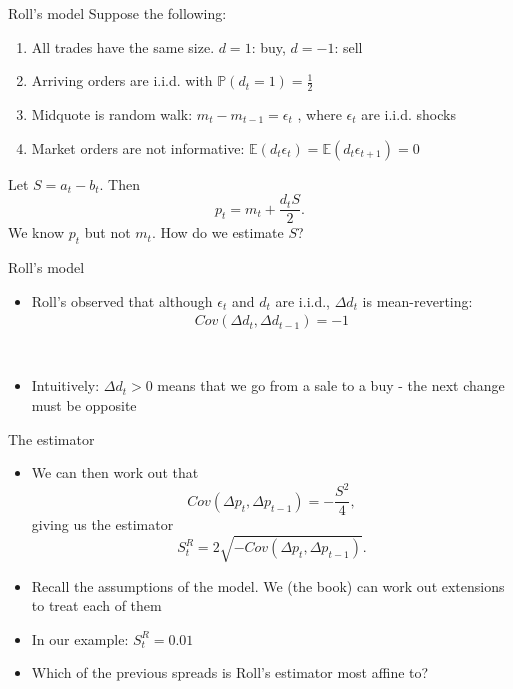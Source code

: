 \documentclass[english,10pt]{beamer}
\begin{document}
\begin{frame}{Roll's model}
	Suppose the following:
	\begin{enumerate}
		\item All trades have the same size. $d=1$: buy, $d=-1$: sell
		\item Arriving orders are i.i.d. with $\mathbb{P}(d_t =1)=\frac{1}{2}$
		\item Midquote is random walk: $m_t -m_{t-1} = \epsilon_t$  , where $\epsilon_t$ are i.i.d. shocks
		\item Market orders are not informative: $\mathbb{E}(d_t \epsilon_t)=\mathbb{E}(d_t \epsilon_{t+1})=0$
	\end{enumerate}
	Let $S = a_t-b_t$. Then
	\[
	p_t = m_t + \frac{d_t S}{2}.
	\]
	We know $p_t$ but not $m_t$. How do we estimate $S$?
\end{frame}


\begin{frame}{Roll's model}
	\begin{itemize}
		\item Roll's observed that although $\epsilon_t$ and $d_t$ are i.i.d., $\Delta d_t$ is mean-reverting:
		\begin{align*}
		Cov(\Delta d_t, \Delta d_{t-1})	= -1
		\\
		\\
		\\
		\\
		\\
		\end{align*}
		\item Intuitively: $\Delta d_t>0$ means that we go from a sale to a buy - the next change must be opposite
	\end{itemize}
\end{frame}


\begin{frame}{The estimator}
	\begin{itemize}
		\item We can then work out that
		\[
		Cov(\Delta p_t, \Delta p_{t-1}) = - \frac{S^2}{4},
		\]
		giving us the estimator
		\[
		S^R_t = 2 \sqrt{-Cov(\Delta p_t, \Delta p_{t-1})}.
		\]
		\item Recall the assumptions of the model. We (the book) can work out extensions to treat each of them
		\item In our example: $S^R_t = 0.01$
		\item Which of the previous spreads is Roll's estimator most affine to?
	\end{itemize}
\end{frame}
\end{document}
